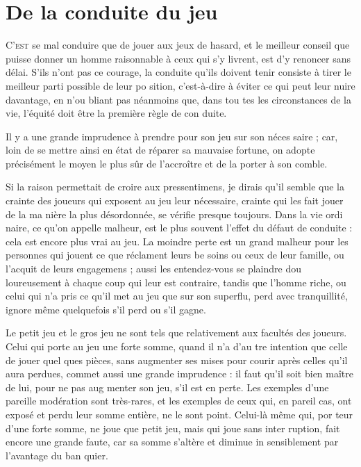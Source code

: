\chapter
    [De la Conduite du Jeu]
    {De la conduite du jeu}

\lettrine{C}{'est} se mal conduire que de jouer
aux jeux de hasard, et le meilleur
conseil que puisse donner un homme
raisonnable à ceux qui s'y livrent,
est d'y renoncer sans délai. S'ils
n'ont pas ce courage, la conduite
qu'ils doivent tenir consiste à tirer
le meilleur parti possible de leur po%
sition, c'est-à-dire à éviter ce qui
peut leur nuire davantage, en n'ou%
bliant pas néanmoins que, dans tou%
tes les circonstances de la vie, l'équité
doit être la première règle de con%
duite.

Il y a une grande imprudence à
prendre pour son jeu sur son néces%
saire ; car, loin de se mettre ainsi en
état de réparer sa mauvaise fortune,
on adopte précisément le moyen le
plus sûr de l'accroître et de la porter
à son comble.

Si la raison permettait de croire
aux pressentimens, je dirais qu'il
semble que la crainte des joueurs
qui exposent au jeu leur nécessaire,
crainte qui les fait jouer de la ma%
nière la plus désordonnée, se vérifie
presque toujours. Dans la vie ordi%
naire, ce qu'on appelle malheur, est
le plus souvent l'effet du défaut de
conduite : cela est encore plus vrai
au jeu. La moindre perte est un grand
malheur pour les personnes qui
jouent ce que réclament leurs be%
soins ou ceux de leur famille, ou
l'acquit de leurs engagemens ; aussi
les entendez-vous se plaindre dou%
loureusement à chaque coup qui leur
est contraire, tandis que l'homme
riche, ou celui qui n'a pris ce qu'il
met au jeu que sur son superflu,
perd avec tranquillité, ignore même
quelquefois s'il perd ou s'il gagne.

Le petit jeu et le gros jeu ne sont
tels que relativement aux facultés
des joueurs. Celui qui porte au jeu
une forte somme, quand il n'a d'au%
tre intention que celle de jouer quel%
ques pièces, sans augmenter ses
mises pour courir après celles qu'il
aura perdues, commet aussi une
grande imprudence : il faut qu'il soit
bien maître de lui, pour ne pas aug%
menter son jeu, s'il est en perte. Les
exemples d'une pareille modération
sont très-rares, et les exemples de
ceux qui, en pareil cas, ont exposé
et perdu leur somme entière, ne le
sont point. Celui-là même qui, por%
teur d'une forte somme, ne joue que
petit jeu, mais qui joue sans inter%
ruption, fait encore une grande faute,
car sa somme s'altère et diminue in%
sensiblement par l'avantage du ban%
quier.

